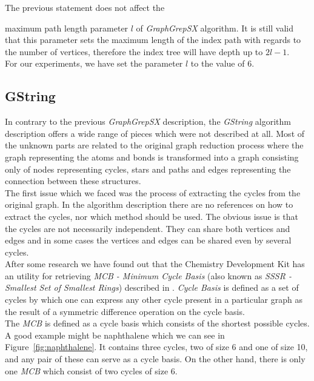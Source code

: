 The previous statement does not affect the {maximum path length parameter $l$ of \textit{GraphGrepSX} algorithm. It is still valid that this parameter sets the maximum length of the index path with regards to the number of vertices, therefore the index tree will have depth up to $2l - 1$.\\
	
For our experiments, we have set the parameter $l$ to the value of 6.

\subsection{GString}

In contrary to the previous \textit{GraphGrepSX} description, the \textit{GString} algorithm description offers a wide range of pieces which were not described at all. Most of the unknown parts are related to the original graph reduction process where the graph representing the atoms and bonds is transformed into a graph consisting only of nodes representing cycles, stars and paths and edges representing the connection between these structures.\\

The first issue which we faced was the process of extracting the cycles from the original graph. In the algorithm description there are no references on how to extract the cycles, nor which method should be used. The obvious issue is that the cycles are not necessarily independent. They can share both vertices and edges and in some cases the vertices and edges can be shared even by several cycles.\\

After some research we have found out that the Chemistry Development Kit has an utility for retrieving \textit{MCB - Minimum Cycle Basis} (also known as \textit{SSSR - Smallest Set of Smallest Rings}) described in \cite{Bauer}. \textit{Cycle Basis} is defined as a set of cycles by which one can express any other cycle present in a particular graph as the result of a symmetric difference operation on the cycle basis.\\

The \textit{MCB} is defined as a cycle basis which consists of the shortest possible cycles. A good example might be naphthalene which we can see in Figure~\ref{fig:naphthalene}. It contains three cycles, two of size 6 and one of size 10, and any pair of these can serve as a cycle basis. On the other hand, there is only one \textit{MCB} which consist of two cycles of size 6.\\

}
